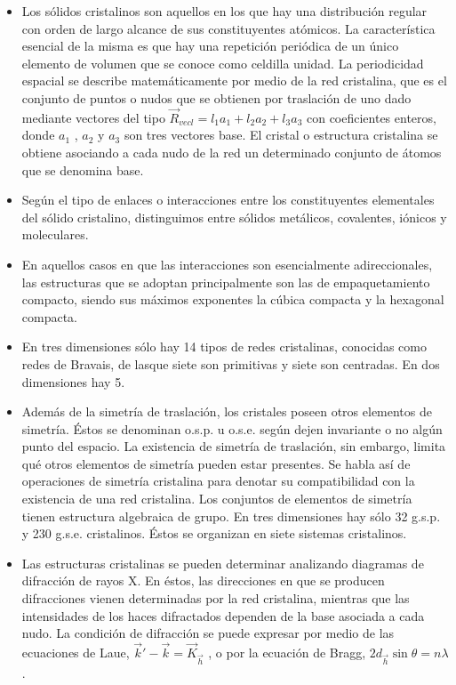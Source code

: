 \documentclass[11pt]{article}
\begin{document}
\begin{itemize}
\item Los sólidos cristalinos son aquellos en los que hay una distribución regular con orden de largo alcance de sus constituyentes atómicos. La característica esencial de la misma es que hay una repetición periódica de un único elemento de volumen que se conoce como celdilla unidad. La periodicidad espacial se describe matemáticamente por medio de la red cristalina, que es el conjunto de puntos o nudos que se obtienen por traslación de uno dado mediante vectores del tipo \(\vec R_{vec l} = l_1 a_1+ l_2 a_2+ l_3 a_3\) con coeficientes enteros, donde \(a_1\) , \(a_2\) y \(a_3\) son tres vectores base. El cristal o estructura cristalina se obtiene asociando a cada nudo de la red un determinado conjunto de átomos que se denomina base.

\item Según el tipo de enlaces o interacciones entre los constituyentes elementales del sólido cristalino, distinguimos entre sólidos metálicos, covalentes, iónicos y moleculares.

\item En aquellos casos en que las interacciones son esencialmente adireccionales, las estructuras que se adoptan principalmente son las de empaquetamiento compacto, siendo sus máximos exponentes la cúbica compacta y la hexagonal compacta.

\item En tres dimensiones sólo hay 14 tipos de redes cristalinas, conocidas como redes de Bravais, de lasque siete son primitivas y siete son centradas. En dos dimensiones hay 5.

\item Además de la simetría de traslación, los cristales poseen otros elementos de simetría. Éstos se denominan o.s.p. u o.s.e. según dejen invariante o no algún punto del espacio. La existencia de simetría de traslación, sin embargo, limita qué otros elementos de simetría pueden estar presentes. Se habla así de operaciones de simetría cristalina para denotar su compatibilidad con la existencia de una red cristalina. Los conjuntos de elementos de simetría tienen estructura algebraica de grupo. En tres dimensiones hay sólo 32 g.s.p. y 230 g.s.e. cristalinos. Éstos se organizan en siete sistemas cristalinos.

\item Las estructuras cristalinas se pueden determinar analizando diagramas de difracción de rayos X. En éstos, las direcciones en que se producen difracciones vienen determinadas por la red cristalina, mientras que las intensidades de los haces difractados dependen de la base asociada a cada nudo. La condición de difracción se puede expresar por medio de las ecuaciones de Laue, \(\vec k'- \vec k=\vec K_{\vec h}\) , o por la ecuación de Bragg, \(2d_{\vec h} \sin\theta = n\lambda\) .


\end{itemize}
\end{document}
